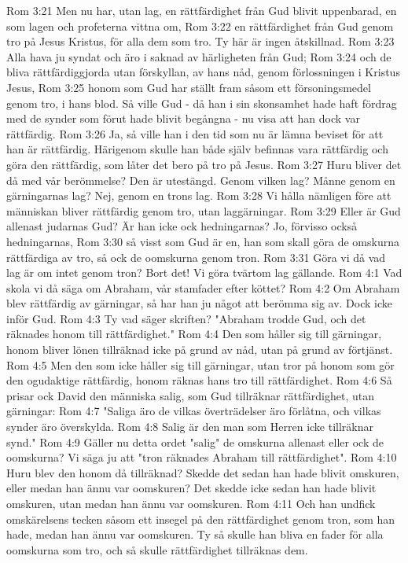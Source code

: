 Rom 3:21  Men nu har, utan lag, en rättfärdighet från Gud blivit uppenbarad, en som lagen och profeterna vittna om,
Rom 3:22  en rättfärdighet från Gud genom tro på Jesus Kristus, för alla dem som tro. Ty här är ingen åtskillnad.
Rom 3:23  Alla hava ju syndat och äro i saknad av härligheten från Gud;
Rom 3:24  och de bliva rättfärdiggjorda utan förskyllan, av hans nåd, genom förlossningen i Kristus Jesus,
Rom 3:25  honom som Gud har ställt fram såsom ett försoningsmedel genom tro, i hans blod. Så ville Gud - då han i sin skonsamhet hade haft fördrag med de synder som förut hade blivit begångna - nu visa att han dock var rättfärdig.
Rom 3:26  Ja, så ville han i den tid som nu är lämna beviset för att han är rättfärdig. Härigenom skulle han både själv befinnas vara rättfärdig och göra den rättfärdig, som låter det bero på tro på Jesus.
Rom 3:27  Huru bliver det då med vår berömmelse? Den är utestängd. Genom vilken lag? Månne genom en gärningarnas lag? Nej, genom en trons lag.
Rom 3:28  Vi hålla nämligen före att människan bliver rättfärdig genom tro, utan laggärningar.
Rom 3:29  Eller är Gud allenast judarnas Gud? Är han icke ock hedningarnas? Jo, förvisso också hedningarnas,
Rom 3:30  så visst som Gud är en, han som skall göra de omskurna rättfärdiga av tro, så ock de oomskurna genom tron.
Rom 3:31  Göra vi då vad lag är om intet genom tron? Bort det! Vi göra tvärtom lag gällande.
Rom 4:1  Vad skola vi då säga om Abraham, vår stamfader efter köttet?
Rom 4:2  Om Abraham blev rättfärdig av gärningar, så har han ju något att berömma sig av. Dock icke inför Gud.
Rom 4:3  Ty vad säger skriften? "Abraham trodde Gud, och det räknades honom till rättfärdighet."
Rom 4:4  Den som håller sig till gärningar, honom bliver lönen tillräknad icke på grund av nåd, utan på grund av förtjänst.
Rom 4:5  Men den som icke håller sig till gärningar, utan tror på honom som gör den ogudaktige rättfärdig, honom räknas hans tro till rättfärdighet.
Rom 4:6  Så prisar ock David den människa salig, som Gud tillräknar rättfärdighet, utan gärningar:
Rom 4:7  "Saliga äro de vilkas överträdelser äro förlåtna, och vilkas synder äro överskylda.
Rom 4:8  Salig är den man som Herren icke tillräknar synd."
Rom 4:9  Gäller nu detta ordet "salig" de omskurna allenast eller ock de oomskurna? Vi säga ju att "tron räknades Abraham till rättfärdighet".
Rom 4:10  Huru blev den honom då tillräknad? Skedde det sedan han hade blivit omskuren, eller medan han ännu var oomskuren? Det skedde icke sedan han hade blivit omskuren, utan medan han ännu var oomskuren.
Rom 4:11  Och han undfick omskärelsens tecken såsom ett insegel på den rättfärdighet genom tron, som han hade, medan han ännu var oomskuren. Ty så skulle han bliva en fader för alla oomskurna som tro, och så skulle rättfärdighet tillräknas dem.
